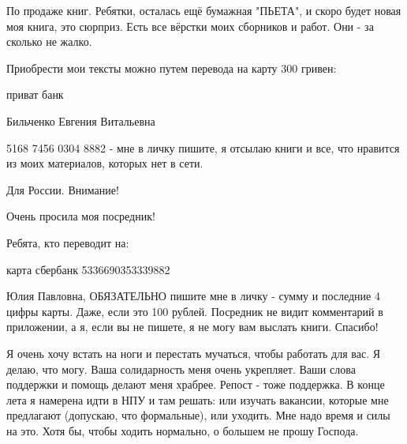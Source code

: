 По продаже книг. Ребятки, осталась ещё бумажная  "ПЬЕТА", и скоро будет новая
моя книга, это сюрприз. Есть все вёрстки моих сборников и работ. Они - за
сколько не жалко.

Приобрести мои тексты можно путем перевода на карту 300 гривен: 

приват банк 

Бильченко Евгения Витальевна

5168 7456 0304 8882 - мне в личку пишите, я отсылаю книги и все, что нравится
из моих материалов, которых нет в сети.

Для России. Внимание! 

Очень просила моя посредник! 

Ребята, кто переводит на: 

карта сбербанк 5336690353339882

Юлия Павловна, ОБЯЗАТЕЛЬНО пишите мне в личку - сумму и последние 4 цифры
карты. Даже, если это 100 рублей. Посредник не видит комментарий в приложении,
а я, если вы не пишете, я не могу вам выслать книги. Спасибо!

Я очень хочу встать на ноги и перестать мучаться, чтобы работать для вас. Я
делаю, что могу. Ваша солидарность меня очень укрепляет. Ваши слова поддержки и
помощь делают меня храбрее. Репост - тоже поддержка. В конце лета я намерена
идти в НПУ и там решать: или изучать вакансии, которые мне предлагают
(допускаю, что формальные), или уходить. Мне надо время и силы на это. Хотя бы,
чтобы ходить нормально, о большем не прошу Господа.



